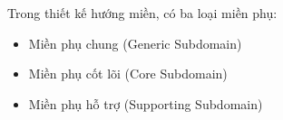Trong thiết kế hướng miền, có ba loại miền phụ:

\begin{itemize}

\item Miền phụ chung (Generic Subdomain)

\item Miền phụ cốt lõi (Core Subdomain)

\item Miền phụ hỗ trợ (Supporting Subdomain)

\end{itemize}